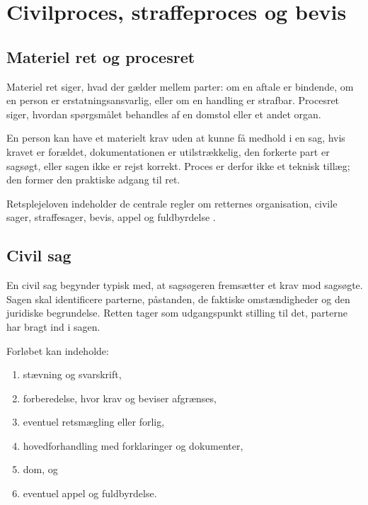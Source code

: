 \chapter{Civilproces, straffeproces og bevis}


\section{Materiel ret og procesret}

Materiel ret siger, hvad der gælder mellem parter: om en aftale er bindende, om en person er erstatningsansvarlig, eller om en handling er strafbar. Procesret siger, hvordan spørgsmålet behandles af en domstol eller et andet organ.

En person kan have et materielt krav uden at kunne få medhold i en sag, hvis kravet er forældet, dokumentationen er utilstrækkelig, den forkerte part er sagsøgt, eller sagen ikke er rejst korrekt. Proces er derfor ikke et teknisk tillæg; den former den praktiske adgang til ret.

Retsplejeloven indeholder de centrale regler om retternes organisation, civile sager, straffesager, bevis, appel og fuldbyrdelse \citep{retsplejeloven}.

\section{Civil sag}

En civil sag begynder typisk med, at sagsøgeren fremsætter et krav mod sagsøgte. Sagen skal identificere parterne, påstanden, de faktiske omstændigheder og den juridiske begrundelse. Retten tager som udgangspunkt stilling til det, parterne har bragt ind i sagen.

Forløbet kan indeholde:
\begin{enumerate}
  \item stævning og svarskrift,
  \item forberedelse, hvor krav og beviser afgrænses,
  \item eventuel retsmægling eller forlig,
  \item hovedforhandling med forklaringer og dokumenter,
  \item dom, og
  \item eventuel appel og fuldbyrdelse.
\end{enumerate}

